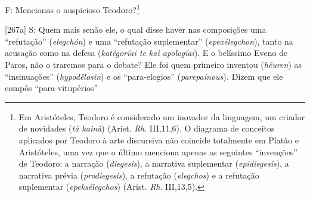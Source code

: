 F: Mencionas o auspicioso Teodoro?\footnote{Em Aristóteles, Teodoro é
  considerado um inovador da linguagem, um criador de novidades
  (\emph{tà kainà}) (Arist. \emph{Rh}. III,11,6). O diagrama de
  conceitos aplicados por Teodoro à arte discursiva não coincide
  totalmente em Platão e Aristóteles, uma vez que o último menciona
  apenas as seguintes ``invenções'' de Teodoro: a narração
  (\emph{diegesis}), a narrativa suplementar (\emph{epidiegesis}), a
  narrativa prévia (\emph{prodiegesis}), a refutação (\emph{elegchos}) e
  a refutação suplementar (\emph{epeksélegchos}) (Arist. \emph{Rh}.
  III,13,5).}

{[}267a{]} S: Quem mais senão ele, o qual disse haver nas composições
uma ``refutação'' (\emph{elegchón}) e uma ``refutação suplementar''
(\emph{epexélegchon}), tanto na acusação como na defesa
(\emph{katêgoríai te kaì apologíai}). E o belíssimo Eveno de Paros, não
o traremos para o debate? Ele foi quem primeiro inventou (\emph{hêuren})
as ``insinuações'' (\emph{hypodḗlosin}) e os ``para-elogios''
(\emph{parepaínous})\emph{.} Dizem que ele compôs ``para-vitupérios''
